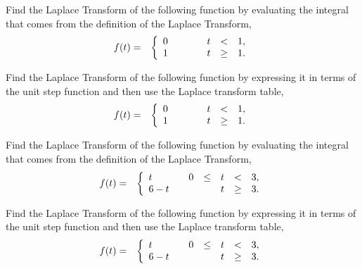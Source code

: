 \begin{problem}

\item Find the Laplace Transform of the following function by
  evaluating the integral that comes from the definition of the
  Laplace Transform,
  \begin{eqnarray*}
    f(t) & = & \left\{
      \begin{array}{l@{\hspace{2em}}rcccl}
        0 &    &  & t & < & 1, \\
        1 &    &  & t & \geq & 1. \\
      \end{array}
    \right.
  \end{eqnarray*}
  \vfill

\item Find the Laplace Transform of the following function by
  expressing it in terms of the unit step function and then use the
  Laplace transform table,
  \begin{eqnarray*}
    f(t) & = & \left\{
      \begin{array}{l@{\hspace{2em}}rcccl}
        0 &    &  & t & < & 1, \\
        1 &    &  & t & \geq & 1. \\
      \end{array}
    \right.
  \end{eqnarray*}
  \vfill

\clearpage

\item Find the Laplace Transform of the following function by
  evaluating the integral that comes from the definition of the
  Laplace Transform,
  \begin{eqnarray*}
    f(t) & = & \left\{
      \begin{array}{l@{\hspace{2em}}rcccl}
        t & 0 & \leq & t & < & 3, \\
        6-t &  &     & t & \geq & 3. \\
      \end{array}
    \right.
  \end{eqnarray*}
  \vfill

\item Find the Laplace Transform of the following function by
  expressing it in terms of the unit step function and then use the
  Laplace transform table,
  \begin{eqnarray*}
    f(t) & = & \left\{
      \begin{array}{l@{\hspace{2em}}rcccl}
        t & 0 & \leq & t & < & 3, \\
        6-t &  &     & t & \geq & 3. \\
      \end{array}
    \right.
  \end{eqnarray*}
  \vfill


\end{problem}
